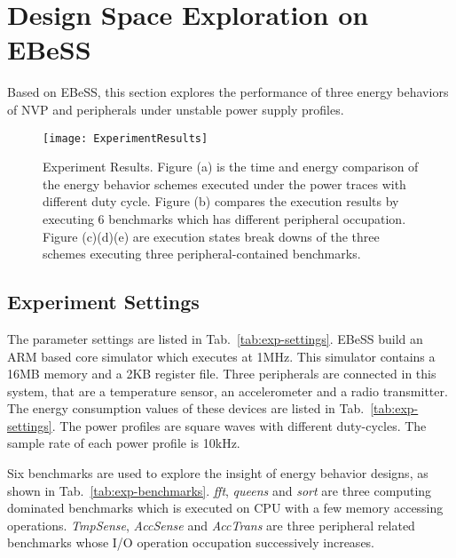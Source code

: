 \section{Design Space Exploration on EBeSS}	\label{sec:exp}
%
Based on EBeSS, this section explores the performance of three energy behaviors of NVP and peripherals under unstable power supply profiles.

\begin{figure*}[!htpb]
	\centering
	\texttt{[image: ExperimentResults]}
	\vspace{-15pt}
	\caption{Experiment Results. Figure (a) is the time and energy comparison of the energy behavior schemes executed under the power traces with different duty cycle. Figure (b) compares the execution results by executing 6 benchmarks which has different peripheral occupation. Figure (c)(d)(e) are execution states break downs of the three schemes executing three peripheral-contained benchmarks.}	\label{fig:ExperimentResults}
	\vspace{-5pt}
\end{figure*}


\subsection{Experiment Settings}	\label{sec:exp-settings}
%
The parameter settings are listed in Tab.~\ref{tab:exp-settings}.
EBeSS build an ARM based core simulator which executes at 1MHz.
This simulator contains a 16MB memory and a 2KB register file.
Three peripherals are connected in this system, that are a temperature sensor, an accelerometer and a radio transmitter.
The energy consumption values of these devices are listed in Tab.~\ref{tab:exp-settings}.
The power profiles are square waves with different duty-cycles.
The sample rate of each power profile is 10kHz.

Six benchmarks are used to explore the insight of energy behavior designs, as shown in Tab.~\ref{tab:exp-benchmarks}.
\emph{fft}, \emph{queens} and \emph{sort} are three computing dominated benchmarks which is executed on CPU with a few memory accessing operations.
\emph{TmpSense}, \emph{AccSense} and \emph{AccTrans} are three peripheral related benchmarks whose I/O operation occupation successively increases.

